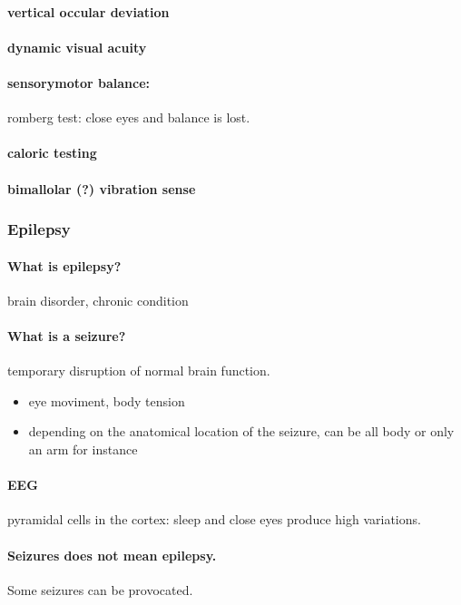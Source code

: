 \documentclass[12pt,article,oneside,a4paper]{memoir}
\begin{document}
\paragraph{vertical occular deviation}
\paragraph{dynamic visual acuity}

\paragraph{sensorymotor balance:} romberg test: close eyes and balance is lost.
\paragraph{caloric testing}
\paragraph{bimallolar (?) vibration sense}

\subsubsection{Epilepsy}
\paragraph{What is epilepsy?} brain disorder, chronic condition
\paragraph{What is a seizure?} temporary disruption of normal brain function.
\begin{itemize}
\item eye moviment, body tension
\item depending on the anatomical location of the seizure, can be all body or only an arm for instance
\end{itemize}
\paragraph{EEG} pyramidal cells in the cortex: sleep and close eyes produce high variations.
\paragraph{Seizures does not mean epilepsy.} Some seizures can be provocated.
\end{document}
